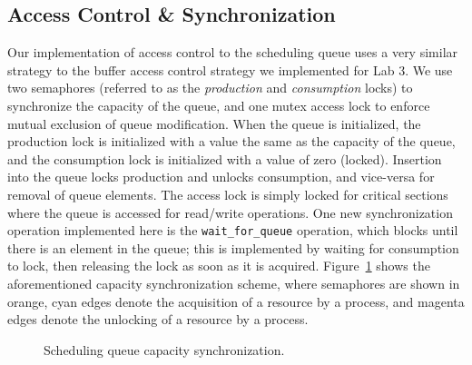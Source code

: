 \documentclass[paper=a4, fontsize=11pt]{scrartcl}
\begin{document}
\subsection*{Access Control \& Synchronization}
\label{design:sync}
Our implementation of access control to the scheduling queue uses a very similar strategy to the buffer access control strategy we implemented for Lab 3. We use two semaphores (referred to as the \textit{production} and \textit{consumption} locks) to synchronize the capacity of the queue, and one mutex access lock to enforce mutual exclusion of queue modification. When the queue is initialized, the production lock is initialized with a value the same as the capacity of the queue, and the consumption lock is initialized with a value of zero (locked). Insertion into the queue locks production and unlocks consumption, and vice-versa for removal of queue elements. The access lock is simply locked for critical sections where the queue is accessed for read/write operations. One new synchronization operation implemented here is the \texttt{wait\_for\_queue} operation, which blocks until there is an element in the queue; this is implemented by waiting for consumption to lock, then releasing the lock as soon as it is acquired. Figure~\ref{fig:qsync} shows the aforementioned capacity synchronization scheme, where semaphores are shown in orange, cyan edges denote the acquisition of a resource by a process, and magenta edges denote the unlocking of a resource by a process.

\begin{figure}[h]
  \centering
  \caption{Scheduling queue capacity synchronization.}
  \label{fig:qsync}
\end{figure}
\end{document}
